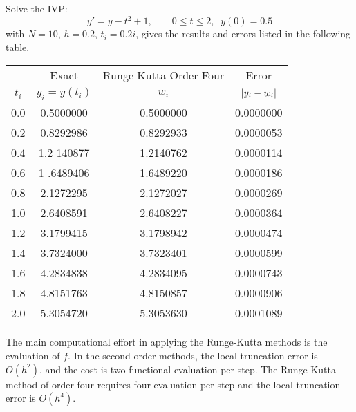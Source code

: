 \documentclass[../main-sheet.tex]{subfiles}
\begin{document}
\begin{ex}
    Solve the IVP:
    \[
        y'=y-t^2+1,\qquad 0\leq t\leq 2,\;\;y(0)=0.5
    \]
    with \(N=10\), \(h=0.2\), \(t_i=0.2i\), gives the results and errors listed in the following table.
    \begin{table}[H]
        \centering
        \begin{tabular}{cccc}
            \toprule
                & Exact      & Runge-Kutta Order Four          & Error          \\
            \(t_i\) & \(y_i=y(t_i)\)     &   \(w_i\)        &   \(\left\vert y_i-w_i\right\vert\)        \\\midrule
            0.0 & 0.5000000  & 0.5000000 & 0.0000000 \\
            0.2 & 0.8292986  & 0.8292933 & 0.0000053 \\
            0.4 & 1.2 140877 & 1.2140762 & 0.0000114 \\
            0.6 & 1 .6489406 & 1.6489220 & 0.0000186 \\
            0.8 & 2.1272295  & 2.1272027 & 0.0000269 \\
            1.0 & 2.6408591  & 2.6408227 & 0.0000364 \\
            1.2 & 3.1799415  & 3.1798942 & 0.0000474 \\
            1.4 & 3.7324000  & 3.7323401 & 0.0000599 \\
            1.6 & 4.2834838  & 4.2834095 & 0.0000743 \\
            1.8 & 4.8151763  & 4.8150857 & 0.0000906 \\
            2.0 & 5.3054720  & 5.3053630 & 0.0001089 \\ \bottomrule
            \end{tabular}
    \end{table}
    \begin{note}
        The main computational effort in applying the Runge-Kutta methods is the evaluation of \(f\).
        In the second-order methods, the local truncation error is \(O(h^2)\), and the cost is two functional evaluation per step.
        The Runge-Kutta method of order four requires four evaluation per step and the local truncation error is \(O(h^4)\).
    \end{note}
\end{ex}
\end{document}
